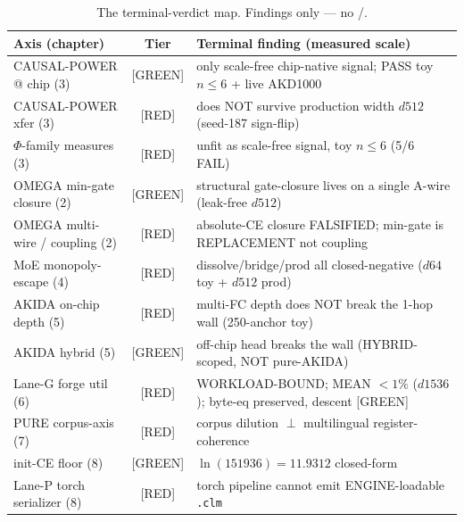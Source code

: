 \documentclass[11pt,a4paper]{article}
\providecommand{\tierGreen}{[GREEN]}
\providecommand{\tierRed}{[RED]}
\begin{document}
\begin{table}[h]
\centering\small
\begin{tabular}{@{}>{\raggedright\arraybackslash}m{3.4cm} c >{\raggedright\arraybackslash}m{7.4cm}@{}}
\toprule
\textbf{Axis (chapter)} & \textbf{Tier} & \textbf{Terminal finding (measured scale)} \\
\midrule
CAUSAL-POWER @ chip (3) & \tierGreen & only scale-free chip-native signal; PASS toy $n\le6$ + live AKD1000 \\
CAUSAL-POWER xfer (3) & \tierRed & does NOT survive production width $d512$ (seed-187 sign-flip) \\
$\Phi$-family measures (3) & \tierRed & unfit as scale-free signal, toy $n\le6$ (5/6 FAIL) \\
OMEGA min-gate closure (2) & \tierGreen & structural gate-closure lives on a single A-wire (leak-free $d512$) \\
OMEGA multi-wire / coupling (2) & \tierRed & absolute-CE closure FALSIFIED; min-gate is REPLACEMENT not coupling \\
MoE monopoly-escape (4) & \tierRed & dissolve/bridge/prod all closed-negative ($d64$ toy + $d512$ prod) \\
AKIDA on-chip depth (5) & \tierRed & multi-FC depth does NOT break the 1-hop wall (250-anchor toy) \\
AKIDA hybrid (5) & \tierGreen & off-chip head breaks the wall (HYBRID-scoped, NOT pure-AKIDA) \\
Lane-G forge util (6) & \tierRed & WORKLOAD-BOUND; MEAN $<1\%$ ($d1536$); byte-eq preserved, descent \tierGreen \\
PURE corpus-axis (7) & \tierRed & corpus dilution $\perp$ multilingual register-coherence \\
init-CE floor (8) & \tierGreen & $\ln(151936)=11.9312$ closed-form \\
Lane-P torch serializer (8) & \tierRed & torch pipeline cannot emit ENGINE-loadable \texttt{.clm} \\
\bottomrule
\end{tabular}
\caption{The terminal-verdict map. Findings only --- no \tierOrange/\tierYellow.}
\label{tab:synthesis}
\end{table}
\end{document}

